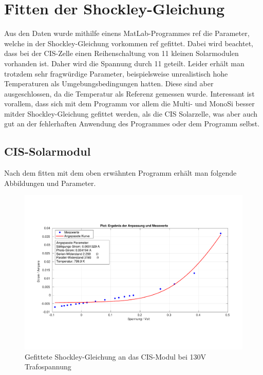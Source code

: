 
\clearpage
\section{Fitten der Shockley-Gleichung}
\label{chapter:fitten}

Aus den Daten wurde mithilfe einens MatLab-Programmes ref die Parameter, welche in der Shockley-Gleichung vorkommen ref gefittet. Dabei wird beachtet, 
dass bei der CIS-Zelle einen Reihenschaltung von 11 kleinen Solarmodulen vorhanden ist. Daher wird die Spannung durch 11 geteilt. Leider erhält man 
trotzdem sehr fragwürdige Parameter, beispielsweise unrealistisch hohe Temperaturen als Umgebungsbedingungen hatten. Diese sind aber ausgeschlossen, 
da die Temperatur als Referenz gemessen wurde.
Interessant ist vorallem, dass sich mit dem Programm vor allem die Multi- und MonoSi besser mitder Shockley-Gleichung gefittet werden, als 
die CIS Solarzelle, was aber auch gut an der fehlerhaften Anwendung des Programmes oder dem Programm selbst.

\subsection{CIS-Solarmodul}

Nach dem fitten mit dem oben erwähnten Programm erhält man folgende Abbildungen und Parameter.

\begin{figure}[ht]
    \centering
    \includegraphics[width = \linewidth]{Bilder/CIS130Plot.pdf}
    \caption{Gefittete Shockley-Gleichung an das CIS-Modul bei 130V Trafospannung}
    
\end{figure}

